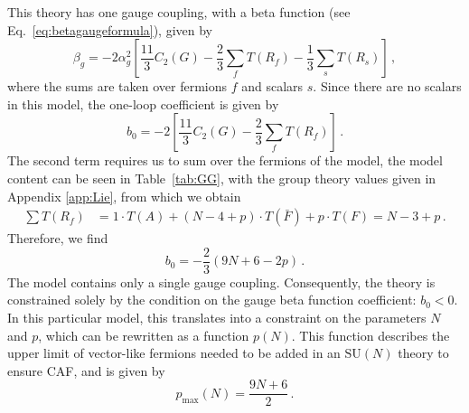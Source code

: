 This theory has one gauge coupling, with a beta function (see Eq.~\eqref{eq:betagaugeformula}), given by
\begin{equation}
    \beta_g=-{2\alpha_g^2}\left[\frac{11}{3}C_2(G)-\frac{2}{3}\sum_f T(R_f)-\frac{1}{3}\sum_s T(R_s)\right]\,, 
\end{equation}
where the sums are taken over fermions $f$ and scalars $s$.
Since there are no scalars in this model, the one-loop coefficient is given by
\begin{equation}
b_0 = -2 \left[ \frac{11}{3} C_2(G) - \frac{2}{3} \sum_f T(R_f)\right] \,.
\end{equation}
The second term requires us to sum over the fermions of the model, the model content can be seen in Table~\ref{tab:GG}, with the group theory values given in Appendix \ref{app:Lie}, from which we obtain
\begin{align}
\sum T(R_f) &= 1 \cdot T(A) + (N-4+p) \cdot T(\bar{F}) + p \cdot T(F)  = N - 3 + p\,.
\end{align}
Therefore, we find
\begin{equation}
    b_0=-\frac{2}{3}\left({9}N+6-2p\right)\,. \label{eq:betagauge}
\end{equation}
The model contains only a single gauge coupling. Consequently, the theory is constrained solely by the condition on the gauge beta function coefficient: $b_0<0$. In this particular model, this translates into a constraint on the parameters $N$ and $p$, which can be rewritten as a function $p(N)$. This function describes the upper limit of vector-like fermions needed to be added in an $\mathrm{SU}(N)$ theory to ensure CAF, and is given by
\begin{equation}
    p_{\text{max}}(N)=\frac{9N+6}{2} \,.
    \label{eq:pNnoscalarGG}
\end{equation} 
